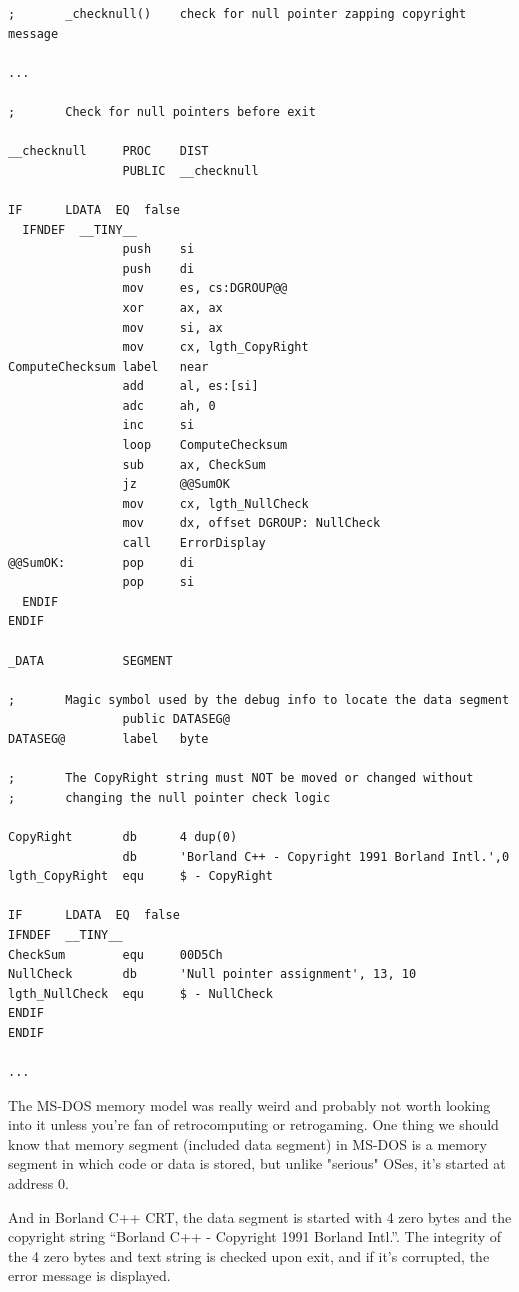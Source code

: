 \begin{lstlisting}
;       _checknull()    check for null pointer zapping copyright message

...

;       Check for null pointers before exit

__checknull     PROC    DIST
                PUBLIC  __checknull

IF      LDATA  EQ  false
  IFNDEF  __TINY__
                push    si
                push    di
                mov     es, cs:DGROUP@@
                xor     ax, ax
                mov     si, ax
                mov     cx, lgth_CopyRight
ComputeChecksum label   near
                add     al, es:[si]
                adc     ah, 0
                inc     si
                loop    ComputeChecksum
                sub     ax, CheckSum
                jz      @@SumOK
                mov     cx, lgth_NullCheck
                mov     dx, offset DGROUP: NullCheck
                call    ErrorDisplay
@@SumOK:        pop     di
                pop     si
  ENDIF
ENDIF

_DATA           SEGMENT

;       Magic symbol used by the debug info to locate the data segment
                public DATASEG@
DATASEG@        label   byte

;       The CopyRight string must NOT be moved or changed without
;       changing the null pointer check logic

CopyRight       db      4 dup(0)
                db      'Borland C++ - Copyright 1991 Borland Intl.',0
lgth_CopyRight  equ     $ - CopyRight

IF      LDATA  EQ  false
IFNDEF  __TINY__
CheckSum        equ     00D5Ch
NullCheck       db      'Null pointer assignment', 13, 10
lgth_NullCheck  equ     $ - NullCheck
ENDIF
ENDIF

...

\end{lstlisting}

The MS-DOS memory model was really weird and probably not worth looking into it unless you're fan of retrocomputing or retrogaming.
One thing we should know that memory segment (included data segment) in MS-DOS is a memory segment in which code or data is stored,
but unlike "serious" OSes, it's started at address 0.

And in Borland C++ CRT, the data segment is started with 4 zero bytes and the copyright string ``Borland C++ - Copyright 1991 Borland Intl.''.
The integrity of the 4 zero bytes and text string is checked upon exit, and if it's corrupted, the error message is displayed.

